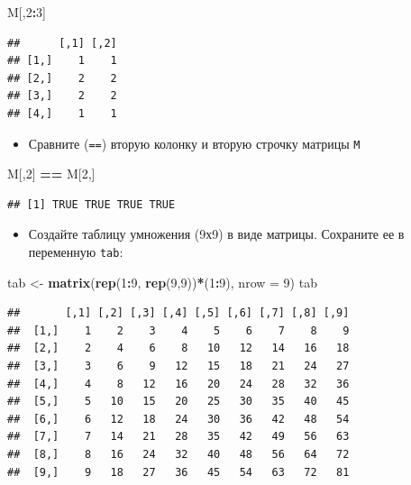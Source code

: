 \documentclass[]{book}
\newenvironment{Shaded}{\begin{snugshade}}{\end{snugshade}}
\newcommand{\DataTypeTok}[1]{\textcolor[rgb]{0.13,0.29,0.53}{#1}}
\newcommand{\DecValTok}[1]{\textcolor[rgb]{0.00,0.00,0.81}{#1}}
\newcommand{\KeywordTok}[1]{\textcolor[rgb]{0.13,0.29,0.53}{\textbf{#1}}}
\newcommand{\NormalTok}[1]{#1}
\newcommand{\OperatorTok}[1]{\textcolor[rgb]{0.81,0.36,0.00}{\textbf{#1}}}
\newcommand{\StringTok}[1]{\textcolor[rgb]{0.31,0.60,0.02}{#1}}
\providecommand{\tightlist}{%
  \setlength{\itemsep}{0pt}\setlength{\parskip}{0pt}}
\begin{document}
\begin{Shaded}
\begin{Highlighting}[]
\NormalTok{M[,}\DecValTok{2}\OperatorTok{:}\DecValTok{3}\NormalTok{]}
\end{Highlighting}
\end{Shaded}

\begin{verbatim}
##      [,1] [,2]
## [1,]    1    1
## [2,]    2    2
## [3,]    2    2
## [4,]    1    1
\end{verbatim}

\begin{itemize}
\tightlist
\item
  Сравните (\texttt{==}) вторую колонку и вторую строчку матрицы \texttt{M}
\end{itemize}

\begin{Shaded}
\begin{Highlighting}[]
\NormalTok{M[,}\DecValTok{2}\NormalTok{] }\OperatorTok{==}\StringTok{ }\NormalTok{M[}\DecValTok{2}\NormalTok{,]}
\end{Highlighting}
\end{Shaded}

\begin{verbatim}
## [1] TRUE TRUE TRUE TRUE
\end{verbatim}

\begin{itemize}
\tightlist
\item
  Создайте таблицу умножения (9х9) в виде матрицы. Сохраните ее в переменную \texttt{tab}:
\end{itemize}

\begin{Shaded}
\begin{Highlighting}[]
\NormalTok{tab <-}\StringTok{ }\KeywordTok{matrix}\NormalTok{(}\KeywordTok{rep}\NormalTok{(}\DecValTok{1}\OperatorTok{:}\DecValTok{9}\NormalTok{, }\KeywordTok{rep}\NormalTok{(}\DecValTok{9}\NormalTok{,}\DecValTok{9}\NormalTok{))}\OperatorTok{*}\NormalTok{(}\DecValTok{1}\OperatorTok{:}\DecValTok{9}\NormalTok{), }\DataTypeTok{nrow =} \DecValTok{9}\NormalTok{)}
\NormalTok{tab}
\end{Highlighting}
\end{Shaded}

\begin{verbatim}
##       [,1] [,2] [,3] [,4] [,5] [,6] [,7] [,8] [,9]
##  [1,]    1    2    3    4    5    6    7    8    9
##  [2,]    2    4    6    8   10   12   14   16   18
##  [3,]    3    6    9   12   15   18   21   24   27
##  [4,]    4    8   12   16   20   24   28   32   36
##  [5,]    5   10   15   20   25   30   35   40   45
##  [6,]    6   12   18   24   30   36   42   48   54
##  [7,]    7   14   21   28   35   42   49   56   63
##  [8,]    8   16   24   32   40   48   56   64   72
##  [9,]    9   18   27   36   45   54   63   72   81
\end{verbatim}
\end{document}
